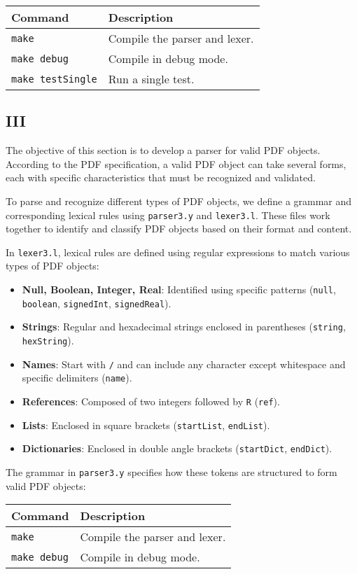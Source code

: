 \documentclass{article}
\begin{document}
\begin{tabular}{|l|p{10cm}|}
    \hline
    \textbf{Command} & \textbf{Description} \\
    \hline
    \texttt{make} & Compile the parser and lexer. \\
    \hline
    \texttt{make debug} & Compile in debug mode. \\
    \hline
    \texttt{make testSingle} & Run a single test. \\
    \hline
\end{tabular}

\newpage

\subsection*{III}

The objective of this section is to develop a parser for valid PDF objects. According to the PDF specification, a valid PDF object can take several forms, each with specific characteristics that must be recognized and validated.

To parse and recognize different types of PDF objects, we define a grammar and corresponding lexical rules using \texttt{parser3.y} and \texttt{lexer3.l}. These files work together to identify and classify PDF objects based on their format and content.

In \texttt{lexer3.l}, lexical rules are defined using regular expressions to match various types of PDF objects:
\begin{itemize}
    \item \textbf{Null, Boolean, Integer, Real}: Identified using specific patterns (\texttt{null}, \texttt{boolean}, \texttt{signedInt}, \texttt{signedReal}).
    \item \textbf{Strings}: Regular and hexadecimal strings enclosed in parentheses (\texttt{string}, \texttt{hexString}).
    \item \textbf{Names}: Start with \texttt{/} and can include any character except whitespace and specific delimiters (\texttt{name}).
    \item \textbf{References}: Composed of two integers followed by \texttt{R} (\texttt{ref}).
    \item \textbf{Lists}: Enclosed in square brackets (\texttt{startList}, \texttt{endList}).
    \item \textbf{Dictionaries}: Enclosed in double angle brackets (\texttt{startDict}, \texttt{endDict}).
\end{itemize}

The grammar in \texttt{parser3.y} specifies how these tokens are structured to form valid PDF objects:

\begin{tabular}{|l|p{10cm}|}
    \hline
    \textbf{Command} & \textbf{Description} \\
    \hline
    \texttt{make} & Compile the parser and lexer. \\
    \hline
    \texttt{make debug} & Compile in debug mode. \\
    \hline
\end{tabular}
\end{document}
